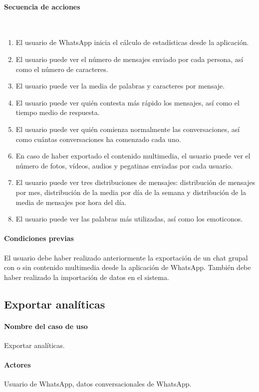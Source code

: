 \paragraph{Secuencia de acciones}\mbox{}\\

\begin{enumerate}
	\item El usuario de WhatsApp inicia el cálculo de estadísticas desde la aplicación.
	\item El usuario puede ver el número de mensajes enviado por cada persona, así como el número de caracteres.
	\item El usuario puede ver la media de palabras y caracteres por mensaje.
	\item El usuario puede ver quién contesta más rápido los mensajes, así como el tiempo medio de respuesta.
	\item El usuario puede ver quién comienza normalmente las conversaciones, así como cuántas conversaciones ha comenzado cada uno.
	\item En caso de haber exportado el contenido multimedia, el usuario puede ver el número de fotos, vídeos, audios y pegatinas enviadas por cada usuario.
	\item El usuario puede ver tres distribuciones de mensajes: distribución de mensajes por mes, distribución de la media por día de la semana y distribución de la media de mensajes por hora del día.
	\item El usuario puede ver las palabras más utilizadas, así como los emoticonos.
\end{enumerate}

\paragraph{Condiciones previas} El usuario debe haber realizado anteriormente la exportación de un chat grupal con o sin contenido multimedia desde la aplicación de WhatsApp. También debe haber realizado la importación de datos en el sistema.

\subsection{Exportar analíticas}

\paragraph{Nombre del caso de uso} Exportar analíticas.
\paragraph{Actores} Usuario de WhatsApp, datos conversacionales de WhatsApp.
